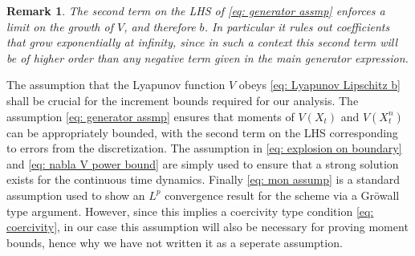 \documentclass{article}
\newtheorem{rem}{Remark}
\begin{document}
\begin{rem}
    The second term on the LHS of \eqref{eq: generator assmp} enforces a limit on the growth of $V$, and therefore $b$. In particular it rules out coefficients that grow exponentially at infinity, since in such a context this second term will be of higher order than any negative term given in the main generator expression.
\end{rem}
The assumption that the Lyapunov function $V$ obeys \eqref{eq: Lyapunov Lipschitz b} shall be crucial for the increment bounds required for our analysis. The assumption \eqref{eq: generator assmp} ensures that moments of $V(X_t)$ and $V(X^n_t)$ can be appropriately bounded, with the second term on the LHS corresponding to errors from the discretization. The assumption in \eqref{eq: explosion on boundary} and \eqref{eq: nabla V power bound} are simply used to ensure that a strong solution exists for the continuous time dynamics. Finally \eqref{eq: mon assump} is a standard assumption used to show an $L^p$ convergence result for the scheme via a Gröwall type argument. However, since this implies a coercivity type condition \eqref{eq: coercivity}, in our case this assumption will also be necessary for proving moment bounds, hence why we have not written it as a seperate assumption.
\end{document}
